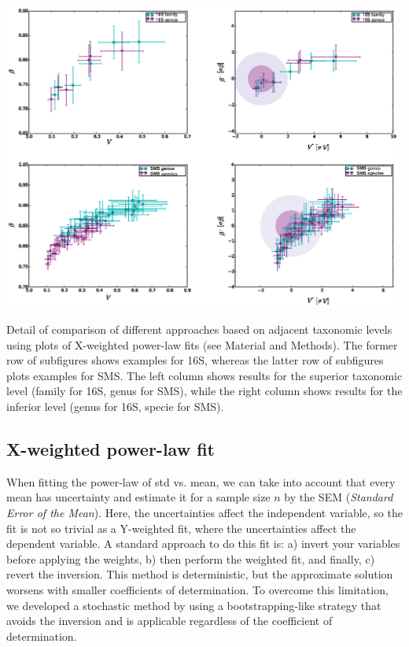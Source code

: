 \begin{supfig} 
  \includegraphics[width=0.99\textwidth]{figs/supfig_taxlev1.eps}
\caption{Detail of comparison of different approaches based on adjacent taxonomic levels using plots of X-weighted power-law fits (see Material and Methods). The former row of subfigures shows examples for 16S, whereas the latter row of subfigures plots examples for SMS. The left column shows results for the superior taxonomic level (family for 16S, genus for SMS), while the right column shows results for the inferior level (genus for 16S, specie for SMS).}
\label{supfig:taxlev2}
\end{supfig}

\subsection*{X-weighted power-law fit}\label{sec:X-w}

When fitting the power-law of std vs. mean, we can take into account that every mean has uncertainty and estimate it for a sample size $n$ by the SEM (\emph{Standard Error of the Mean}). Here, the uncertainties affect the independent variable, so the fit is not so trivial as a Y-weighted fit, where the uncertainties affect the dependent variable. A standard approach to do this fit is: a) invert your variables before applying the weights, b) then perform the weighted fit, and finally, c) revert the inversion. This method is deterministic, but the approximate solution worsens with smaller coefficients of determination. To overcome this limitation, we developed a stochastic method by using a bootstrapping-like strategy that avoids the inversion and is applicable regardless of the coefficient of determination. 

